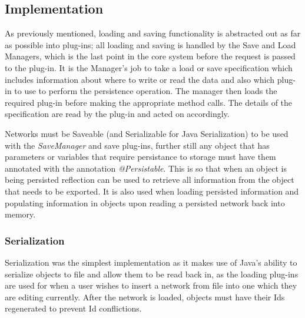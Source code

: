 \documentclass{acm_proc_article-sp}
\begin{document}
\subsection{Implementation}
{
As previously mentioned, loading and saving functionality is abstracted out as far as possible into plug{}-ins; all loading and saving is handled by the Save and Load Managers, which is the last point in the core system before the request is passed to the plug{}-in. It is the Manager's job to take a load or save specification which includes information about where to write or read the data and also which plug{}-in to use to perform the persistence operation. The manager then loads the required plug{}-in before making the appropriate method
calls. The details of the specification are read by the plug{}-in and acted on accordingly.

Networks must be Saveable (and Serializable for Java Serialization) to be used with the {\itshape SaveManager} and save plug{}-ins, further still any object
that has parameters or variables that require persistance to storage must have them annotated with the annotation {\itshape @Persistable}. This is so that when an object is being persisted reflection can be used to retrieve all information from the object that needs to be exported. It is also used when loading persisted information and populating information in objects upon reading a persisted network back into memory.
}
\subsubsection{Serialization}
{
Serialization was the simplest implementation as it makes use of
Java's ability to serialize objects to file and allow
them to be read back in, as the loading plug{}-ins are used for when a
user wishes to insert a network from file into one which they are
editing currently. After the network is loaded, objects must have their
Ids regenerated to prevent Id conflictions.
}
\end{document}
